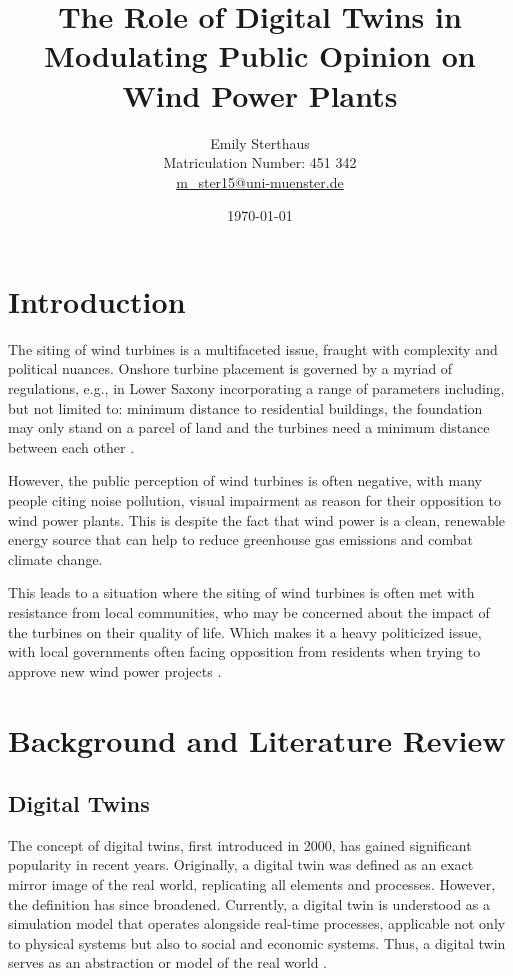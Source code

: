 \documentclass[11pt, titlepage, a4paper]{scrartcl}
\title{The Role of Digital Twins in Modulating Public Opinion on Wind Power Plants}
\author{Emily Sterthaus \\ Matriculation Number: 451 342 \\ \href{mailto:m_ster15@uni-muenster.de}{m\_ster15@uni-muenster.de}}
\affil{Institute of Geoinformatics, University of Münster}
\date{\today}
\begin{document}
\maketitle


\newpage
\tableofcontents
\newpage
\begin{linenumbers}
    \section{Introduction}
    The siting of wind turbines is a multifaceted issue, fraught with complexity and political nuances. Onshore
    turbine placement is governed by a myriad of regulations, e.g., in Lower Saxony incorporating a range of parameters including, but not
    limited to: minimum distance to residential buildings, the foundation may only stand on a parcel of land and the
    turbines need a minimum distance between each other
    \cite{niedersachsischesministeriumfurumweltenergieundklimaschutzPlanungUndGenehmigung2021}.

    However, the public perception of wind turbines is often negative, with many people citing noise pollution, visual impairment as reason for their opposition to wind power plants. This is despite the fact that wind power is a clean, renewable energy source that can help to reduce greenhouse gas emissions and combat climate change.

    This leads to a situation where the siting of wind turbines is often met with resistance from local communities, who may be concerned about the impact of the turbines on their quality of life. Which makes it a heavy politicized issue, with local governments often facing opposition from residents when trying to approve new wind power projects \cite{kwasniewskiWindenergieVerhindertAntiWindkraftBewegung2021}.

    \section{Background and Literature Review}
    \subsection{Digital Twins}
    The concept of digital twins, first introduced in 2000, has gained significant popularity in recent years. Originally, a digital twin was defined as an exact mirror image of the real world, replicating all elements and processes. However, the definition has since broadened. Currently, a digital twin is understood as a simulation model that operates alongside real-time processes, applicable not only to physical systems but also to social and economic systems. Thus, a digital twin serves as an abstraction or model of the real world \cite{battyDigitalTwins2018}.


\end{linenumbers}
\end{document}
